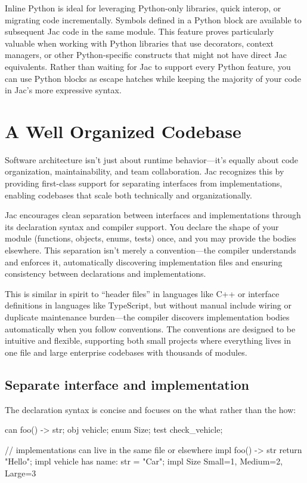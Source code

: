 Inline Python is ideal for leveraging Python-only libraries, quick interop, or migrating code incrementally. Symbols defined in a Python block are available to subsequent Jac code in the same module. This feature proves particularly valuable when working with Python libraries that use decorators, context managers, or other Python-specific constructs that might not have direct Jac equivalents. Rather than waiting for Jac to support every Python feature, you can use Python blocks as escape hatches while keeping the majority of your code in Jac's more expressive syntax.

\section{A Well Organized Codebase}

Software architecture isn't just about runtime behavior—it's equally about code organization, maintainability, and team collaboration. Jac recognizes this by providing first-class support for separating interfaces from implementations, enabling codebases that scale both technically and organizationally.

Jac encourages clean separation between interfaces and implementations through its declaration syntax and compiler support. You declare the shape of your module (functions, objects, enums, tests) once, and you may provide the bodies elsewhere. This separation isn't merely a convention—the compiler understands and enforces it, automatically discovering implementation files and ensuring consistency between declarations and implementations.

This is similar in spirit to ``header files'' in languages like C++ or interface definitions in languages like TypeScript, but without manual include wiring or duplicate maintenance burden—the compiler discovers implementation bodies automatically when you follow conventions. The conventions are designed to be intuitive and flexible, supporting both small projects where everything lives in one file and large enterprise codebases with thousands of modules.

\subsection*{Separate interface and implementation}

The declaration syntax is concise and focuses on the what rather than the how:

\begin{jacblock}
can foo() -> str;
obj vehicle;
enum Size;
test check_vehicle;

// implementations can live in the same file or elsewhere
impl foo() -> str { return "Hello"; }
impl vehicle { has name: str = "Car"; }
impl Size { Small=1, Medium=2, Large=3 }
\end{jacblock}

